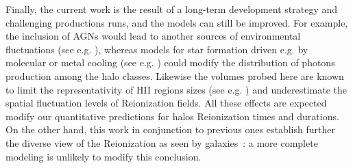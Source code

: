 \documentclass[twocolumn]{aastex61}
\begin{document}
Finally, the current work is the result of a long-term development strategy and  challenging productions runs, and the models can still be improved. For example, the inclusion of AGNs would lead to another sources of environmental fluctuations (see e.g. \citet{CHA15}), whereas models for star formation driven e.g. by molecular or metal cooling (see e.g. \citet{WIS9}) could modify the distribution of photons production among the halo classes. Likewise the volumes probed here are known to limit the representativity of HII regions sizes (see e.g. \citet{ILI6}) and underestimate the spatial fluctuation levels of Reionization fields.  All these effects are expected modify our quantitative predictions for halos Reionization times and durations. On the other hand, this work in conjunction to previous ones establish further the diverse view of the Reionization as seen by galaxies~: a more complete modeling is unlikely to modify this conclusion.


\end{document}
